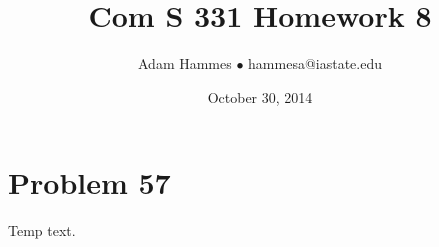 \documentclass[11pt]{article}
\begin{document}
\title{Com S 331 Homework 8}
\author{Adam Hammes $\bullet$ hammesa@iastate.edu}
\date{October 30, 2014}
\maketitle

\section*{Problem 57}

Temp text.
\end{document}
